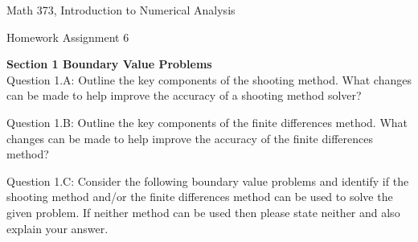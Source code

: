 \documentclass{article}
\begin{document}

\large

{\Large Math 373, Introduction to Numerical Analysis}


{\Large Homework Assignment 6} 
 \medskip \par

{\bf Section 1 Boundary Value Problems}  \\
%
Question 1.A: Outline the key components of the shooting method. What changes can be made to help improve the accuracy of a shooting method solver? 
\par \medskip \noindent 
%
Question 1.B: Outline the key components of the finite differences method. What changes can be made to help improve the accuracy of the finite differences method? 
\par \medskip \noindent 
%
Question 1.C: Consider the following boundary value problems and identify if the shooting method and/or the finite differences method can be used to solve the given problem.  If neither method can be used then please state neither and also explain your answer. 
\end{document}
